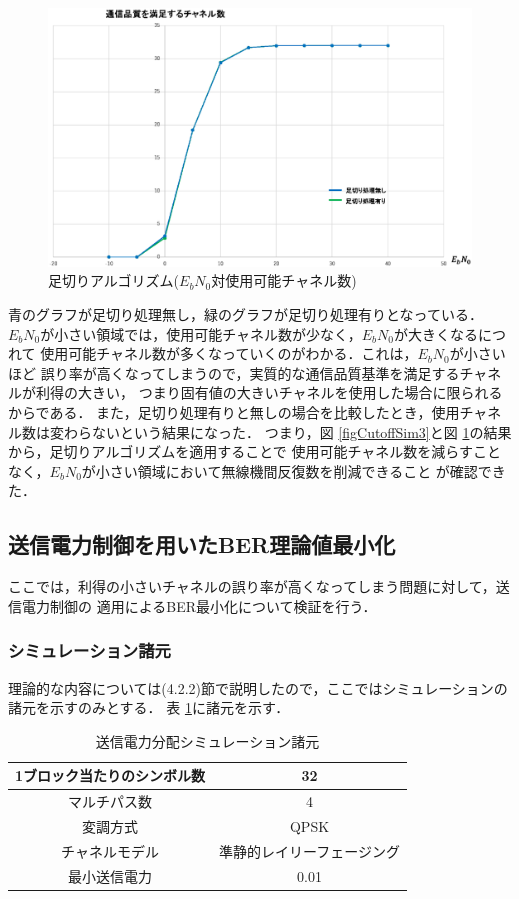 \begin{figure}[ht]
    \centering
    \includegraphics[width=0.95\linewidth]{chapter4/figure/CutoffSim4.eps}
    \caption{足切りアルゴリズム($E_bN_0$対使用可能チャネル数)}
    \label{figCutoffSim4}
\end{figure}

青のグラフが足切り処理無し，緑のグラフが足切り処理有りとなっている．
$E_bN_0$が小さい領域では，使用可能チャネル数が少なく，$E_bN_0$が大きくなるにつれて
使用可能チャネル数が多くなっていくのがわかる．これは，$E_bN_0$が小さいほど
誤り率が高くなってしまうので，実質的な通信品質基準を満足するチャネルが利得の大きい，
つまり固有値の大きいチャネルを使用した場合に限られるからである．
また，足切り処理有りと無しの場合を比較したとき，使用チャネル数は変わらないという結果になった．
つまり，図 \ref{figCutoffSim3}と図 \ref{figCutoffSim4}の結果から，足切りアルゴリズムを適用することで
使用可能チャネル数を減らすことなく，$E_bN_0$が小さい領域において無線機間反復数を削減できること
が確認できた．

\subsection{送信電力制御を用いたBER理論値最小化}
ここでは，利得の小さいチャネルの誤り率が高くなってしまう問題に対して，送信電力制御の
適用によるBER最小化について検証を行う．

\subsubsection{シミュレーション諸元}
理論的な内容については(4.2.2)節で説明したので，ここではシミュレーションの諸元を示すのみとする．
表 \ref{tabPcon1}に諸元を示す．

\begin{table}[ht]
    \begin{tabular}{|c|c|} \hline
        1ブロック当たりのシンボル数 & 32 \\ \hline
        マルチパス数 & 4 \\ \hline
        変調方式 & QPSK \\ \hline
        チャネルモデル & 準静的レイリーフェージング \\ \hline
        最小送信電力 & 0.01 \\ \hline
    \end{tabular}
    \centering
    \caption{送信電力分配シミュレーション諸元}
    \label{tabPcon1}
\end{table}

